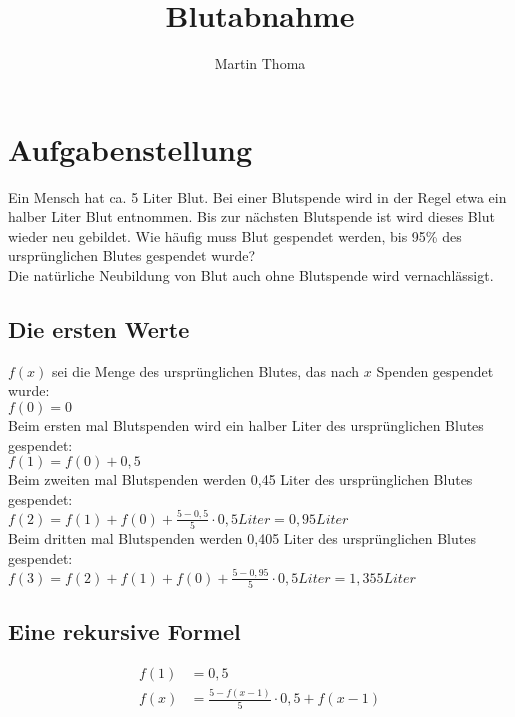 \documentclass[a4paper,9pt]{scrartcl}
\begin{document}
 \title{Blutabnahme}
 \author{Martin Thoma}

 \setcounter{section}{1}
 \section*{Aufgabenstellung}
    Ein Mensch hat ca. 5 Liter Blut. Bei einer Blutspende wird in der Regel etwa
    ein halber Liter Blut entnommen. Bis zur nächsten Blutspende ist wird dieses
    Blut wieder neu gebildet. Wie häufig muss Blut gespendet werden, bis 95\% 
    des ursprünglichen Blutes gespendet wurde?\\

    \noindent Die natürliche Neubildung von Blut auch ohne Blutspende wird vernachlässigt.

    \subsection{Die ersten Werte}
    $f(x)$ sei die Menge des ursprünglichen Blutes, das nach $x$ Spenden gespendet 
    wurde:\\
    $f(0) = 0$\\
    Beim ersten mal Blutspenden wird ein halber Liter des ursprünglichen Blutes  
    gespendet:\\
    $f(1) = f(0) + 0{,}5$\\
    Beim zweiten mal Blutspenden werden 0,45 Liter des ursprünglichen Blutes 
    gespendet:\\
    $f(2) = f(1) + f(0) + \frac{5-0{,}5}{5} \cdot 0{,}5 Liter = 0{,}95 Liter $\\
    Beim dritten mal Blutspenden werden 0,405 Liter des ursprünglichen Blutes  
    gespendet:\\
    $f(3) = f(2) + f(1) + f(0) + \frac{5-0{,}95}{5} \cdot 0{,}5 Liter = 1{,}355 Liter$

    \subsection{Eine rekursive Formel}
        \begin{align}
            f(1) &= 0{,}5 \\
            f(x) &= \frac{5-f(x-1)}{5} \cdot 0{,}5 + f(x-1)
        \end{align}
\end{document}
